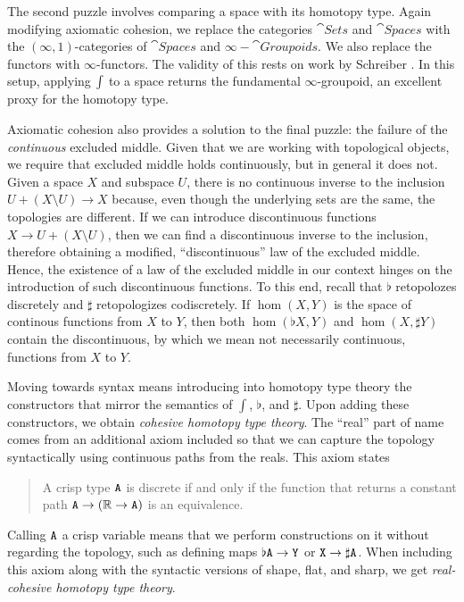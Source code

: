 \documentclass{amsart}
\begin{document}
The second puzzle involves comparing a space with its
homotopy type.  Again modifying axiomatic cohesion, we
replace the categories $ \cat{Sets} $ and $ \cat{Spaces} $
with the $ (\infty,1) $-categories of $ \cat{Spaces} $ and $
\infty-\cat{Groupoids} $. We also replace the functors with
$ \infty $-functors.  The validity of this rests on work by
Schreiber \cite{schreib:diff}. In this setup, applying $
\int $ to a space returns the fundamental $ \infty
$-groupoid, an excellent proxy for the homotopy type.  

Axiomatic cohesion also provides a solution to the final
puzzle: the failure of the \emph{continuous} excluded
middle. Given that we are working with topological objects,
we require that excluded middle holds continuously, but in
general it does not. Given a space $ X $ and subspace $ U $,
there is no continuous inverse to the inclusion
$ U + (X \setminus U) \to X $ because, even though the
underlying sets are the same, the topologies are
different. If we can introduce discontinuous functions
$ X \to U + (X \setminus U) $, then we can find a
discontinuous inverse to the inclusion, therefore obtaining
a modified, ``discontinuous'' law of the excluded
middle. Hence, the existence of a law of the excluded middle
in our context hinges on the introduction of such
discontinuous functions. To this end, recall that $ \flat $
retopolozes discretely and $ \sharp $ retopologizes
codiscretely. If $ \hom (X,Y) $ is the space of continous
functions from $ X $ to $ Y $, then both $ \hom (\flat X,Y)
$ and $ \hom (X,\sharp Y) $ contain the discontinuous, by
which we mean not necessarily continuous, functions from $ X
$ to $ Y $.  

Moving towards syntax means introducing into homotopy type
theory the constructors that mirror the semantics of $ \int $,
$ \flat $, and $ \sharp $. Upon adding these constructors,
we obtain \emph{cohesive homotopy type theory}. The ``real''
part of name comes from an additional axiom included so that
we can capture the topology syntactically using continuous
paths from the reals. This axiom states
\begin{center}
\begin{quotation}
  A crisp type $ \mathtt{A} $ is discrete if and only if the
  function that returns a constant path
  $ \mathtt{A} \to (\mathbb{R} \to \mathtt{A}) $ is an equivalence.
\end{quotation}
\end{center}
Calling $ \mathtt{A} $ a crisp variable means that we
perform constructions on it without regarding the topology,
such as defining maps $ \flat\mathtt{A} \to \mathtt{Y} $ or $
\mathtt{X}\to\sharp\mathtt{A} $.  When including this axiom
along with the syntactic versions of shape, flat, and sharp,
we get \emph{real-cohesive homotopy type theory}.
\end{document}
